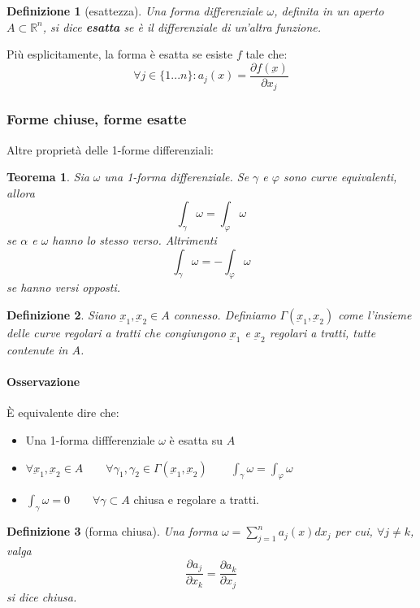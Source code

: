 \documentclass[a4paper,12pt]{article}
\newtheorem{teo}{Teorema}
\newtheorem{defi}{Definizione}
\begin{document}
\begin{defi}[esattezza]
Una forma differenziale $\omega$, definita in un aperto $A\subset\mathbb{R}^n$, si dice \textbf{esatta} se è il differenziale di un'altra funzione.
\end{defi}
Più esplicitamente, la forma è esatta se esiste $f$ tale che:
$$\forall j\in\{1 ... n\}: a_j(x) = \frac{\partial f(\underbar{x})}{\partial x_j}$$

\subsubsection{Forme chiuse, forme esatte}
Altre proprietà delle 1-forme differenziali:
\begin{teo}
 Sia $\omega$ una 1-forma differenziale. Se $\gamma$ e $\varphi$ sono curve equivalenti, allora
 $$\int_\gamma \omega = \int_\varphi \omega$$
 se $\alpha$ e $\omega$ hanno lo stesso verso. Altrimenti
 $$\int_\gamma \omega = -\int_\varphi \omega$$
 se hanno versi opposti.
\end{teo}

\begin{defi}
 Siano $\underbar{x}_1, \underbar{x}_2\in A$ connesso.
 Definiamo $\Gamma(\underbar{x}_1, \underbar{x}_2)$ come l'insieme delle curve regolari a tratti che congiungono $\underbar{x}_1$ e $\underbar{x}_2$ regolari a tratti, tutte contenute in $A$.
\end{defi}

\paragraph{Osservazione}
È equivalente dire che:
\begin{itemize}
 \item Una 1-forma diffferenziale $\omega$ è esatta su $A$
 \item $\forall \underbar{x}_1, \underbar{x}_2 \in A\qquad \forall\gamma_1,\gamma_2\in\Gamma(\underbar{x}_1, \underbar{x}_2)\qquad \int_\gamma \omega = \int_\varphi \omega$
 \item $\int_\gamma \omega = 0\qquad\forall\gamma\subset A$ chiusa e regolare a tratti.
\end{itemize}

\begin{defi}[forma chiusa]
 Una forma $\omega = \sum_{j=1}^n a_j(x)dx_j$ per cui, $\forall j\neq k$, valga
 $$\frac{\partial a_j}{\partial x_k} = \frac{\partial a_k}{\partial x_j} $$
 si dice chiusa.
\end{defi}
\end{document}
